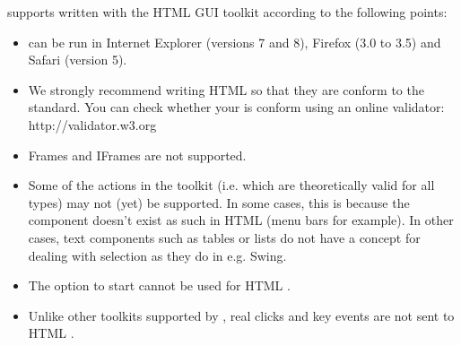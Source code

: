 \app{} supports \gdauts{} written with the HTML GUI toolkit according to the following points:

\begin{itemize}
\item \gdauts{} can be run in Internet Explorer (versions 7 and 8), Firefox (3.0 to 3.5) and Safari (version 5). 
\item We strongly recommend writing HTML \gdauts{} so that they are conform to the  standard. You can check whether your \gdaut{} is  conform using an online validator: http://validator.w3.org
\item Frames and IFrames are not supported.
\item Some of the \app{} actions in the  toolkit (i.e. which are theoretically valid for all \gdaut{} types) may not (yet) be supported. In some cases, this is because the component doesn't exist as such in HTML \gdauts{} (menu bars for example). In other cases, text components such as tables or lists do not have a concept for dealing with selection as they do in e.g. Swing. 
\item The  option to start \gdauts{}  cannot be used for HTML \gdauts{}. 
\item Unlike other toolkits supported by \app{}, real clicks and key events are not sent to HTML \gdauts{}.
\end{itemize}
